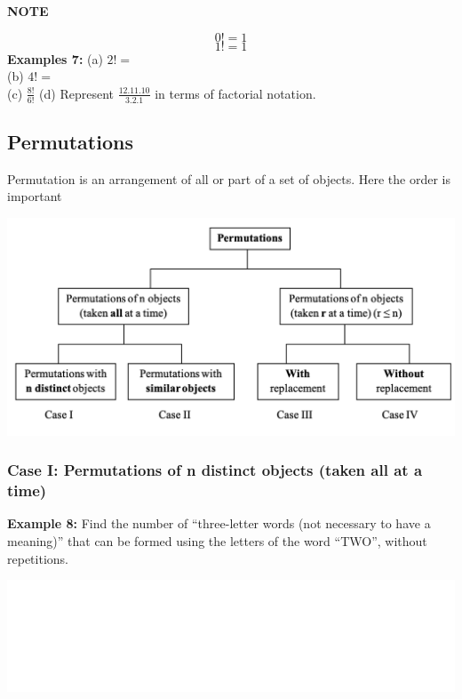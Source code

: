 \documentclass[]{book}
\begin{document}
\textbf{NOTE}

\[0! = 1\]
\[1! = 1\]
\textbf{Examples 7:}
(a) \(2!=\)\\
(b) \(4!=\)\\
(c) \(\frac{8!}{6!}\)
(d) Represent \(\frac{12.11.10}{3.2.1}\) in terms of factorial notation.

\hypertarget{permutations}{%
\subsection{Permutations}\label{permutations}}

Permutation is an arrangement of all or part of a set of objects. Here the order is important

\begin{center}\includegraphics[width=1\linewidth]{figure/Permutations} \end{center}

\hypertarget{case-i-permutations-of-n-distinct-objects-taken-all-at-a-time}{%
\subsubsection{Case I: Permutations of n distinct objects (taken all at a time)}\label{case-i-permutations-of-n-distinct-objects-taken-all-at-a-time}}

\textbf{Example 8:} Find the number of ``three-letter words (not necessary to have a meaning)'' that can be formed using the letters of the word ``TWO'', without repetitions.

\begin{center}\includegraphics[width=1\linewidth]{figure/box84-1} \end{center}
\end{document}
